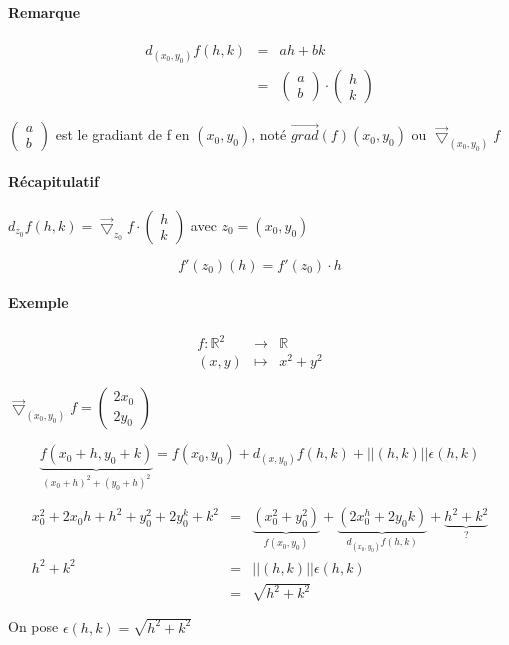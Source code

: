 \paragraph{Remarque} \[\begin{array}{rcl}
	d_{(x_0, y_0)}f(h, k) &=& ah + bk \\
	&=& \begin{pmatrix}
a \\
b\end{pmatrix} \cdot \begin{pmatrix}
h \\
k\end{pmatrix}\end{array}\]

$\begin{pmatrix}
a\\
b\end{pmatrix}$ est le gradiant de f en $(x_0, y_0)$, noté $\vec{grad}(f) (x_0, y_0)$ ou $\vec{\bigtriangledown}_{(x_0, y_0)} f$

\paragraph{Récapitulatif} $d_{z_0} f(h, k) = \vec{\bigtriangledown}_{z_0}f \cdot\begin{pmatrix}
h \\
k\end{pmatrix}$ avec $z_0 = (x_0, y_0)$

\[f'(z_0)(h) = f'(z_0)\cdot h\]

\paragraph{Exemple}

\[\begin{array}{rcl}
	f:\mathbb{R}^2 &\rightarrow &\mathbb{R}\\
	(x, y) &\mapsto& x^2 + y^2\end{array}\]

$\vec{\bigtriangledown}_{(x_0, y_0)} f = \begin{pmatrix}
2x_0 \\
2y_0\end{pmatrix}$

\[\underbrace{f(x_0+h, y_0+k)}_{(x_0+h)^2 + (y_0+h)^2} = f(x_0, y_0) + d_{(x, y_0)}f(h, k) + || (h, k)||\epsilon(h, k)\]

\[\begin{array}{rcl}
	x_0^2 + 2x_0h + h^2 + y_0^2 + 2y_0^k + k^2 &=& \underbrace{(x_0^2 + y_0^2)}_{ f(x_0, y_0)}  + \underbrace{(2x_0^h + 2y_0k)}_{d_{(x_0, y_0)}f(h, k)}  + \underbrace{h^2 + k^2}_{?} \\
h^2 + k^2 &=& ||(h, k)||\epsilon(h, k) \\
				&=& \sqrt{h^2 + k^2}\end{array}\]

On pose $\epsilon(h, k) = \sqrt{h^2 + k^2}$

